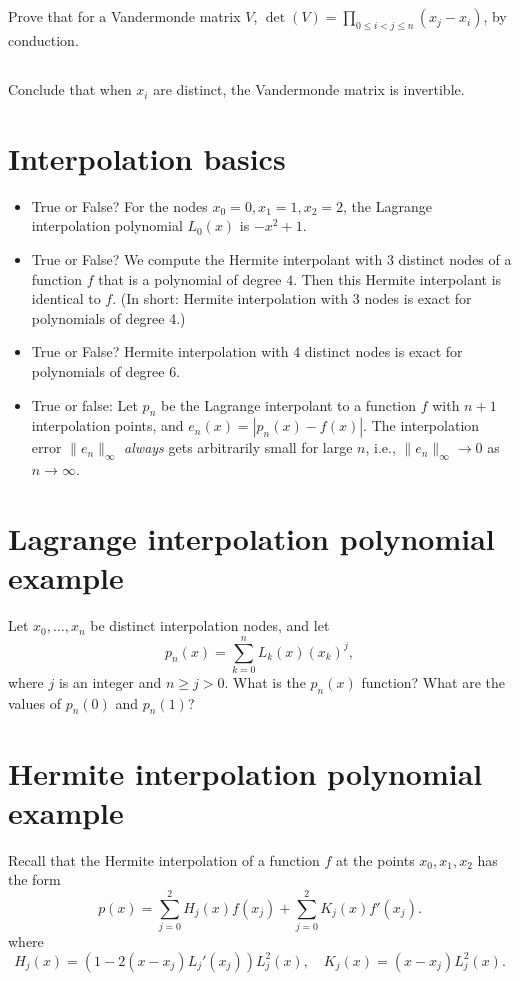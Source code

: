 \documentclass{article}%
\begin{document}
\subsection{}
Prove that for a Vandermonde matrix $V$, $\det(V)=\prod_{0\leq i<j\leq n}(x_j-x_i)$, by conduction.
\subsection{}
Conclude that when $x_i$ are distinct, the Vandermonde matrix is invertible.

\section{Interpolation basics}
\begin{itemize}
\item True or False? For the nodes $x_0=0, x_1=1, x_2= 2$, the
  Lagrange interpolation polynomial $L_0(x)$ is $-x^2 + 1$.
\item True or False? We compute the Hermite interpolant with 3 distinct nodes of
  a function $f$ that is a polynomial of degree $4$. Then this
  Hermite interpolant is identical to $f$. (In short: Hermite
  interpolation with 3 nodes is exact for polynomials of degree 4.)
\item True or False? Hermite interpolation with 4 distinct nodes is exact for
  polynomials of degree 6.
\item True or false: Let $p_n$ be the Lagrange interpolant to a
function $f$ with $n+1$ interpolation points, and $e_n(x) =
|p_n(x) - f(x)|$.  The interpolation error $\|e_n\|_\infty$ {\em
always} gets arbitrarily small for large $n$, i.e.,
$\|e_n\|_\infty \rightarrow 0$ as $n \rightarrow \infty$.
\end{itemize}

\section{Lagrange interpolation polynomial example}
Let $x_0,\ldots, x_n$ be distinct interpolation nodes, and let
  $$
  p_n(x) = \sum^n_{k=0}L_{k}(x)(x_k)^j,
  $$
where $j$ is an integer and $n \geq j>0$. What is the $p_n(x)$ function? What are the values of $p_n(0)$ and $p_n(1)$?

\section{Hermite interpolation polynomial example}
Recall that the Hermite interpolation of a function $f$ at the points $x_0,x_1,x_2$ has the form 
$$p(x) = \sum_{j=0}^2H_j(x)f(x_j)
+ \sum_{j=0}^2K_j(x)f'(x_j).$$ 
where 
$$
H_j(x) = (1-2(x-x_j)L_j'(x_j))L_j^2(x),\quad K_j(x) = (x-x_j)L_j^2(x).
$$
\end{document}
